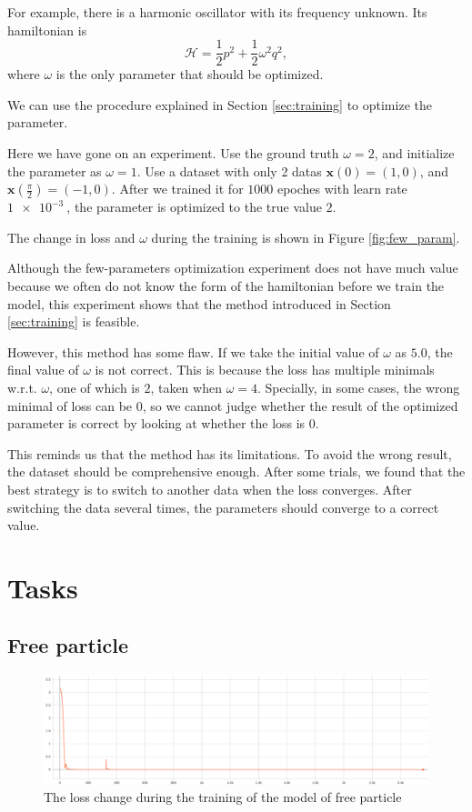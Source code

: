 \documentclass{article}
\begin{document}
For example, there is a harmonic oscillator with its frequency unknown.
Its hamiltonian is
\begin{equation}
	\mathcal H=\frac12p^2+\frac12\omega^2q^2,
\end{equation}
where $\omega$ is the only parameter that should be optimized.

We can use the procedure explained in Section \ref{sec:training}
to optimize the parameter.

Here we have gone on an experiment.
Use the ground truth $\omega=2$, and initialize the parameter as $\omega=1$.
Use a dataset with only 2 datas $\mathbf x\left(0\right)=\left(1,0\right)$,
and $\mathbf x\left(\frac\pi2\right)=\left(-1,0\right)$.
After we trained it for $1000$ epoches with learn rate $\SI{1e-3}{}$,
the parameter is optimized to the true value $2$.

The change in loss and $\omega$ during the training is shown in Figure \ref{fig:few_param}.

Although the few-parameters optimization experiment does not have much value
because we often do not know the form of the hamiltonian before we train the model,
this experiment shows that the method introduced in Section \ref{sec:training} is feasible.

However, this method has some flaw. If we take the initial value of $\omega$ as $5.0$,
the final value of $\omega$ is not correct.
This is because the loss has multiple minimals w.r.t. $\omega$,
one of which is $2$, taken when $\omega=4$.
Specially, in some cases, the wrong minimal of loss can be $0$,
so we cannot judge whether the result of the optimized parameter is correct
by looking at whether the loss is $0$.

This reminds us that the method has its limitations.
To avoid the wrong result, the dataset should be comprehensive enough.
After some trials, we found that the best strategy is to switch to another data
when the loss converges.
After switching the data several times,
the parameters should converge to a correct value.

\section{Tasks}

\subsection{Free particle}

\begin{figure}[h]
	\centering
	\includegraphics[width=\linewidth]{free_loss.png}
	\caption{The loss change during the training of the model of free particle}
	\label{fig:free_loss}
\end{figure}
\end{document}
